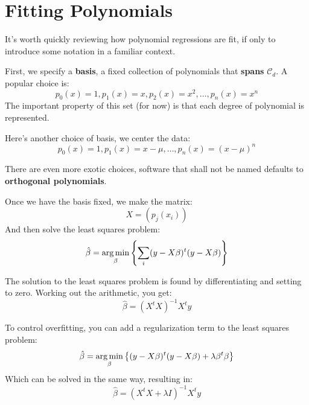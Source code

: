 \section{Fitting Polynomials}
%
\begin{frame}
  It's worth quickly reviewing how polynomial regressions are fit, if only to
  introduce some notation in a familiar context.
\end{frame}
%
\begin{frame}
  First, we specify a \textbf{basis}, a fixed collection of polynomials that \textbf{spans}
  $\mathcal{C}_d$.  A popular choice is:
  $$ p_0(x) = 1, p_1(x) = x, p_2(x) = x^2, \ldots, p_n(x) = x^n $$
  The important property of this set (for now) is that each degree of polynomial is represented.
\end{frame}
%
\begin{frame}
  Here's another choice of basis, we center the data:
  $$ p_0(x) = 1, p_1(x) = x - \mu, \ldots, p_n(x) = (x - \mu)^n $$
\end{frame}
%
\begin{frame}
  There are even more exotic choices, software that shall not be named defaults
  to \textbf{orthogonal polynomials}.
\end{frame}
%
\begin{frame}
  Once we have the basis fixed, we make the matrix:
  $$ X = \left( p_j(x_i) \right) $$
  And then solve the least squares problem:
  $$ \hat{\beta} = \operatorname*{arg\,min}_{\beta} \left\{ \sum_i (y - X \beta)^t (y - X \beta)
  \right\} $$
\end{frame}
%
\begin{frame}
  The solution to the least squares problem is found by differentiating and
  setting to zero.  Working out the arithmetic, you get:
  $$ \hat{\beta} = (X^t X)^{-1} X^t y  $$
\end{frame}
%
\begin{frame}
  To control overfitting, you can add a regularization term to the least squares problem:
  $$ \hat{\beta} = \operatorname*{arg\,min}_{\beta} \left\{ (y - X \beta)^t (y - X \beta) + \lambda \beta^t \beta \right\} $$
  Which can be solved in the same way, resulting in:
  $$ \hat{\beta} = (X^t X + \lambda I)^{-1} X^t y $$
\end{frame}

